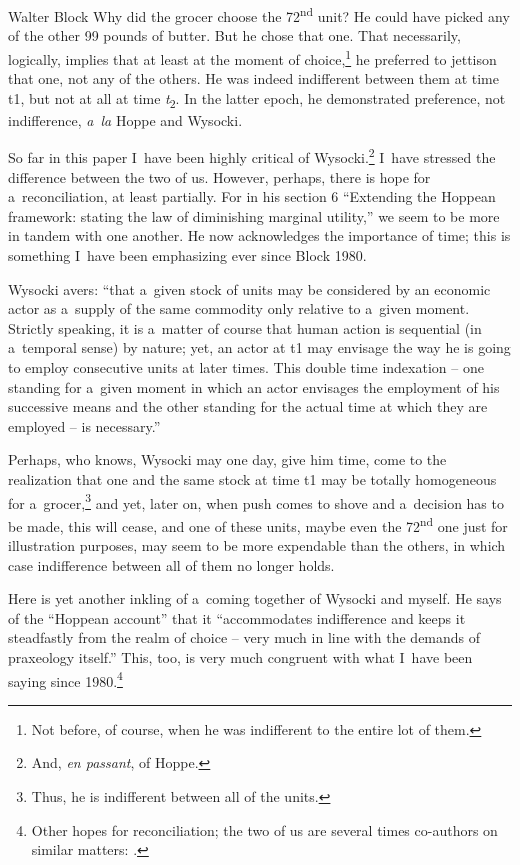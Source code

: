 \begin{artengenv}{Walter Block}
Why did the grocer choose the 72\textsuperscript{nd} unit? He could have picked any of the other 99 pounds of butter. But he chose that one. That necessarily, logically, implies that at least at the moment of choice,\footnote{Not before, of course, when he was indifferent to the entire lot of them.} he preferred to jettison that one, not any of the others. He was indeed indifferent between them at time t1, but not at all at time \textit{t}\textsubscript{2}. In the latter epoch, he demonstrated preference, not indifference, \textit{a~la} Hoppe and Wysocki.

So far in this paper I~have been highly critical of Wysocki.\footnote{And, \textit{en passant}, of Hoppe.} I~have stressed the difference between the two of us. However, perhaps, there is hope for a~reconciliation, at least partially. For in his section 6 ``Extending the Hoppean framework: stating the law of diminishing marginal utility,'' we seem to be more in tandem with one another. He now acknowledges the importance of time; this is something I~have been emphasizing ever since Block 1980.

Wysocki avers: ``that a~given stock of units may be considered by an economic actor as a~supply of the same commodity only relative to a~given moment. Strictly speaking, it is a~matter of course that human action is sequential (in a~temporal sense) by nature; yet, an actor at t1 may envisage the way he is going to employ consecutive units at later times. This double time indexation -- one standing for a~given moment in which an actor envisages the employment of his successive means and the other standing for the actual time at which they are employed -- is necessary.''

Perhaps, who knows, Wysocki may one day, give him time, come to the realization that one and the same stock at time t1 may be totally homogeneous for a~grocer,\footnote{Thus, he is indifferent between all of the units.} and yet, later on, when push comes to shove and a~decision has to be made, this will cease, and one of these units, maybe even the 72\textsuperscript{nd} one just for illustration purposes, may seem to be more expendable than the others, in which case indifference between all of them no longer holds.

Here is yet another inkling of a~coming together of Wysocki and myself. He says of the ``Hoppean account'' that it ``accommodates indifference and keeps it steadfastly from the realm of choice -- very much in line with the demands of praxeology itself.'' This, too, is very much congruent with what I~have been saying since 1980.\footnote{Other hopes for reconciliation; the two of us are several times co-authors on similar matters:
\parencites[][]{wysocki_analysis_2018}[][]{wysocki_homogeneity_2019}.%
}


\end{artengenv}
